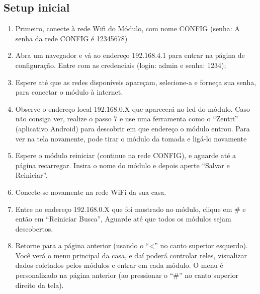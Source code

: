 \subsection{Setup inicial}
\begin{enumerate}
	\item Primeiro, conecte à rede Wifi do Módulo, com nome CONFIG (senha: A senha da rede CONFIG é 12345678)
	\item Abra um navegador e vá ao endereço 192.168.4.1 para entrar na página de configuração. Entre com as credenciais (login: admin e senha: 1234);
	\item Espere até que as redes disponíveis apareçam, selecione-a e forneça sua senha, para conectar o módulo à internet.
	\item Observe o endereço local 192.168.0.X que aparecerá no lcd do módulo. Caso não consiga ver, realize o passo 7 e use uma ferramenta como o “Zentri” (aplicativo Android) para descobrir em que endereço o módulo entrou. Para ver na tela novamente, pode tirar o módulo da tomada e ligá-lo novamente
	\item Espere o módulo reiniciar (continue na rede CONFIG), e aguarde até a página recarregar. Insira o nome do módulo e depois aperte “Salvar e Reiniciar”.
	\item Conecte-se novamente na rede WiFi da sua casa.
	\item Entre no endereço 192.168.0.X que foi mostrado no módulo, clique em \# e então em “Reiniciar Busca”, Aguarde até que todos os módulos sejam descobertos.
	\item Retorne para a página anterior (usando o “<” no canto superior esquerdo). Você verá o menu principal da casa, e daí poderá controlar reles, visualizar dados coletados pelos módulos e entrar em cada módulo. O menu é personalizado na página anterior (ao pressionar o “\#” no canto superior direito da tela).
\end{enumerate}
